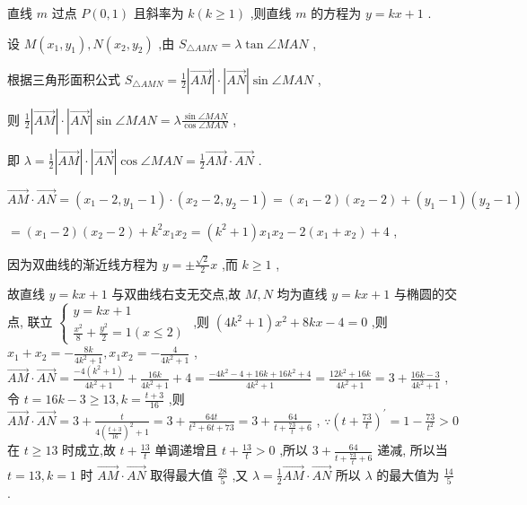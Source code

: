 \documentclass[10pt]{article}
\begin{document}
直线 \(m\) 过点 \(P\left( {0,1}\right)\) 且斜率为 \(k\left( {k \geq  1}\right)\) ,则直线 \(m\) 的方程为 \(y = {kx} + 1\) .

设 \(M\left( {{x}_{1},{y}_{1}}\right) ,N\left( {{x}_{2},{y}_{2}}\right)\) ,由 \({S}_{\bigtriangleup {AMN}} = \lambda \tan \angle {MAN}\) ,

根据三角形面积公式 \({S}_{\bigtriangleup {AMN}} = \frac{1}{2}\left| \overrightarrow{AM}\right|  \cdot  \left| \overrightarrow{AN}\right| \sin \angle {MAN}\) ,

则 \(\frac{1}{2}\left| \overrightarrow{AM}\right|  \cdot  \left| \overrightarrow{AN}\right| \sin \angle {MAN} = \lambda \frac{\sin \angle {MAN}}{\cos \angle {MAN}}\) ,

即 \(\lambda  = \frac{1}{2}\left| \overrightarrow{AM}\right|  \cdot  \left| \overrightarrow{AN}\right| \cos \angle {MAN} = \frac{1}{2}\overrightarrow{AM} \cdot  \overrightarrow{AN}\) .

\(\overrightarrow{AM} \cdot  \overrightarrow{AN} = \left( {{x}_{1} - 2,{y}_{1} - 1}\right)  \cdot  \left( {{x}_{2} - 2,{y}_{2} - 1}\right)  = \left( {{x}_{1} - 2}\right) \left( {{x}_{2} - 2}\right)  + \left( {{y}_{1} - 1}\right) \left( {{y}_{2} - 1}\right)\)

\(= \left( {{x}_{1} - 2}\right) \left( {{x}_{2} - 2}\right)  + {k}^{2}{x}_{1}{x}_{2} = \left( {{k}^{2} + 1}\right) {x}_{1}{x}_{2} - 2\left( {{x}_{1} + {x}_{2}}\right)  + 4\) ,

因为双曲线的渐近线方程为 \(y =  \pm  \frac{\sqrt{2}}{2}x\) ,而 \(k \geq  1\) ,

故直线 \(y = {kx} + 1\) 与双曲线右支无交点,故 \(M,N\) 均为直线 \(y = {kx} + 1\) 与椭圆的交点, 联立 \(\left\{  \begin{array}{l} y = {kx} + 1 \\  \frac{{x}^{2}}{8} + \frac{{y}^{2}}{2} = 1\left( {x \leq  2}\right)  \end{array}\right.\) ,则 \(\left( {4{k}^{2} + 1}\right) {x}^{2} + {8kx} - 4 = 0\) ,则 \({x}_{1} + {x}_{2} =  - \frac{8k}{4{k}^{2} + 1},{x}_{1}{x}_{2} =  - \frac{4}{4{k}^{2} + 1}\) , \(\overrightarrow{AM} \cdot  \overrightarrow{AN} = \frac{-4\left( {{k}^{2} + 1}\right) }{4{k}^{2} + 1} + \frac{16k}{4{k}^{2} + 1} + 4 = \frac{-4{k}^{2} - 4 + {16k} + {16}{k}^{2} + 4}{4{k}^{2} + 1} = \frac{{12}{k}^{2} + {16k}}{4{k}^{2} + 1} = 3 + \frac{{16k} - 3}{4{k}^{2} + 1}\) , 令 \(t = {16k} - 3 \geq  {13},k = \frac{t + 3}{16}\) ,则 \(\overrightarrow{AM} \cdot  \overrightarrow{AN} = 3 + \frac{t}{4{\left( \frac{t + 3}{16}\right) }^{2} + 1} = 3 + \frac{64t}{{t}^{2} + {6t} + {73}} = 3 + \frac{64}{t + \frac{73}{t} + 6}\) , \(\because {\left( t + \frac{73}{t}\right) }^{\prime } = 1 - \frac{73}{{t}^{2}} > 0\) 在 \(t \geq  {13}\) 时成立,故 \(t + \frac{13}{t}\) 单调递增且 \(t + \frac{13}{t} > 0\) ,所以 \(3 + \frac{64}{t + \frac{73}{t} + 6}\) 递减, 所以当 \(t = {13},k = 1\) 时 \(\overrightarrow{AM} \cdot  \overrightarrow{AN}\) 取得最大值 \(\frac{28}{5}\) ,又 \(\lambda  = \frac{1}{2}\overrightarrow{AM} \cdot  \overrightarrow{AN}\) 所以 \(\lambda\) 的最大值为 \(\frac{14}{5}\) .
\end{document}
